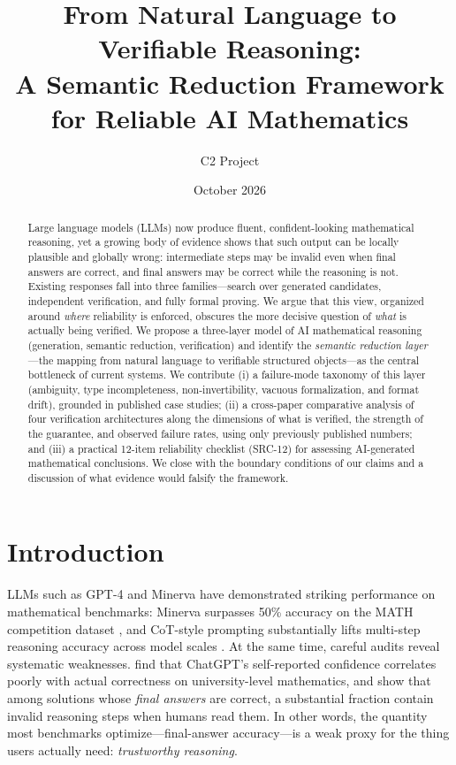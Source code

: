 \documentclass[11pt,a4paper]{article}
\title{\textbf{From Natural Language to Verifiable Reasoning:\\
A Semantic Reduction Framework for Reliable AI Mathematics}}
\author{C2 Project}
\date{October 2026}
\begin{document}
\maketitle

\begin{abstract}
Large language models (LLMs) now produce fluent, confident-looking mathematical reasoning, yet a growing body of evidence shows that such output can be locally plausible and globally wrong: intermediate steps may be invalid even when final answers are correct, and final answers may be correct while the reasoning is not. Existing responses fall into three families---search over generated candidates, independent verification, and fully formal proving. We argue that this view, organized around \emph{where} reliability is enforced, obscures the more decisive question of \emph{what} is actually being verified. We propose a three-layer model of AI mathematical reasoning (generation, semantic reduction, verification) and identify the \emph{semantic reduction layer}---the mapping from natural language to verifiable structured objects---as the central bottleneck of current systems. We contribute (i) a failure-mode taxonomy of this layer (ambiguity, type incompleteness, non-invertibility, vacuous formalization, and format drift), grounded in published case studies; (ii) a cross-paper comparative analysis of four verification architectures along the dimensions of what is verified, the strength of the guarantee, and observed failure rates, using only previously published numbers; and (iii) a practical 12-item reliability checklist (SRC-12) for assessing AI-generated mathematical conclusions. We close with the boundary conditions of our claims and a discussion of what evidence would falsify the framework.
\end{abstract}

\section{Introduction}\label{sec:intro}

LLMs such as GPT-4 and Minerva have demonstrated striking performance on mathematical benchmarks: Minerva surpasses 50\% accuracy on the MATH competition dataset \citep{hendrycks2021math,lewkowycz2022minerva}, and CoT-style prompting substantially lifts multi-step reasoning accuracy across model scales \citep{wei2022cot}. At the same time, careful audits reveal systematic weaknesses. \citet{frieder2023chatgpt} find that ChatGPT's self-reported confidence correlates poorly with actual correctness on university-level mathematics, and \citet{uesato2022feedback} show that among solutions whose \emph{final answers} are correct, a substantial fraction contain invalid reasoning steps when humans read them. In other words, the quantity most benchmarks optimize---final-answer accuracy---is a weak proxy for the thing users actually need: \emph{trustworthy reasoning}.
\end{document}
